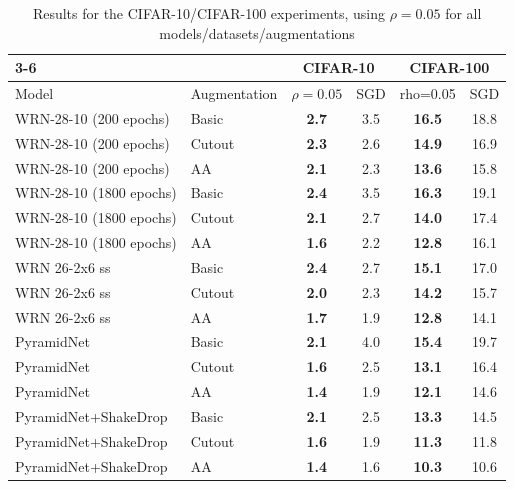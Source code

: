 \documentclass{article} %
\begin{document}
\begin{table}[h]
\centering
\begin{tabular}{ll|cc|cc|}
\cline{3-6}
                                              &              & \multicolumn{2}{c|}{CIFAR-10} & \multicolumn{2}{c|}{CIFAR-100} \\ \hline
\multicolumn{1}{|l}{Model}                    & Augmentation & $\rho=0.05$          & SGD      & rho=0.05           & SGD      \\ \hline
\multicolumn{1}{|l|}{WRN-28-10 (200 epochs)}  & Basic        & \textbf{2.7}      & 3.5      & \textbf{16.5}      & 18.8     \\
\multicolumn{1}{|l|}{WRN-28-10 (200 epochs)}  & Cutout       & \textbf{2.3}      & 2.6      & \textbf{14.9}      & 16.9     \\
\multicolumn{1}{|l|}{WRN-28-10 (200 epochs)}  & AA           & \textbf{2.1}      & 2.3      & \textbf{13.6}      & 15.8     \\ \hline
\multicolumn{1}{|l|}{WRN-28-10 (1800 epochs)} & Basic        & \textbf{2.4}      & 3.5      & \textbf{16.3}      & 19.1     \\
\multicolumn{1}{|l|}{WRN-28-10 (1800 epochs)} & Cutout       & \textbf{2.1}      & 2.7      & \textbf{14.0}      & 17.4     \\
\multicolumn{1}{|l|}{WRN-28-10 (1800 epochs)} & AA           & \textbf{1.6}      & 2.2      & \textbf{12.8}      & 16.1     \\ \hline
\multicolumn{1}{|l|}{WRN 26-2x6 ss}           & Basic        & \textbf{2.4}      & 2.7      & \textbf{15.1}      & 17.0     \\
\multicolumn{1}{|l|}{WRN 26-2x6 ss}           & Cutout       & \textbf{2.0}      & 2.3      & \textbf{14.2}      & 15.7     \\
\multicolumn{1}{|l|}{WRN 26-2x6 ss}           & AA           & \textbf{1.7}      & 1.9      & \textbf{12.8}      & 14.1     \\ \hline
\multicolumn{1}{|l|}{PyramidNet}              & Basic        & \textbf{2.1}      & 4.0      & \textbf{15.4}      & 19.7     \\
\multicolumn{1}{|l|}{PyramidNet}              & Cutout       & \textbf{1.6}      & 2.5      & \textbf{13.1}      & 16.4     \\
\multicolumn{1}{|l|}{PyramidNet}              & AA           & \textbf{1.4}      & 1.9      & \textbf{12.1}      & 14.6     \\ \hline
\multicolumn{1}{|l|}{PyramidNet+ShakeDrop}    & Basic        & \textbf{2.1}      & 2.5      & \textbf{13.3}      & 14.5     \\
\multicolumn{1}{|l|}{PyramidNet+ShakeDrop}    & Cutout       & \textbf{1.6}      & 1.9      & \textbf{11.3}      & 11.8     \\
\multicolumn{1}{|l|}{PyramidNet+ShakeDrop}    & AA           & \textbf{1.4}      & 1.6      & \textbf{10.3}      & 10.6     \\ \hline
\end{tabular}
\caption{Results for the CIFAR-10/CIFAR-100 experiments, using $\rho=0.05$ for all models/datasets/augmentations}
\label{tab:cifar_no_rho_tuning}
\end{table}
\end{document}
